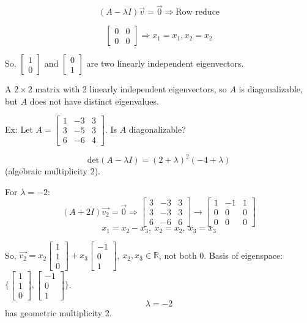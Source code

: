 \documentclass{article}
\begin{document}
\[ (A - \lambda I)\vec{v} = \vec{0} \Rightarrow \text{Row reduce} \]

\[ \begin{bmatrix} 0 & 0 \\ 0 & 0 \end{bmatrix} \Rightarrow x_1 = x_1, x_2 = x_2 \]

So, \( \begin{bmatrix} 1 \\ 0 \end{bmatrix} \) and \( \begin{bmatrix} 0 \\ 1 \end{bmatrix} \) are two linearly independent eigenvectors. 

A \( 2 \times 2 \) matrix with 2 linearly independent eigenvectors, so \( A \) is diagonalizable, but \( A \) does not have distinct eigenvalues.


Ex: Let \( A = \begin{bmatrix} 1 & -3 & 3 \\ 3 & -5 & 3 \\ 6 & -6 & 4 \end{bmatrix} \). Is \( A \) diagonalizable? 

\[ \text{det}(A-\lambda I) = (2+\lambda)^2(-4+\lambda) \] (algebraic multiplicity 2).

For \( \lambda = -2 \): 
\[ (A+2I)\vec{v_2} = \vec{0} \Rightarrow \begin{bmatrix} 3 & -3 & 3 \\ 3 & -3 & 3 \\ 6 & -6 & 6 \end{bmatrix} \rightarrow \begin{bmatrix} 1 & -1 & 1 \\ 0 & 0 & 0 \\ 0 & 0 & 0 \end{bmatrix} \]
\[ x_1 = x_2 - x_3, \ x_2 = x_2, \ x_3 = x_3 \]

So, \( \vec{v_2} = x_2\begin{bmatrix} 1 \\ 1 \\ 0 \end{bmatrix} + x_3\begin{bmatrix} -1 \\ 0 \\ 1 \end{bmatrix} \), \( x_2, x_3 \in \mathbb{R} \), not both 0. Basis of eigenspace: \( \{ \begin{bmatrix} 1 \\ 1 \\ 0 \end{bmatrix}, \begin{bmatrix} -1 \\ 0 \\ 1 \end{bmatrix} \} \). 
\[ \lambda = -2 \] has geometric multiplicity 2.
\end{document}
